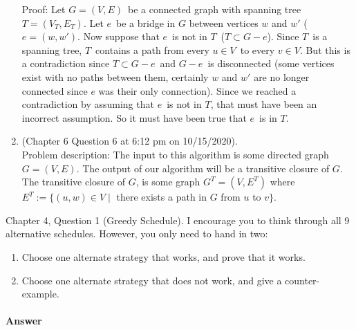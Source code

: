 \documentclass{article}
\begin{document}
\begin{enumerate}
        Proof: Let $G=(V,E)$ be a connected graph with spanning tree $T=(V_T,E_T)$.
        Let $e$ be a bridge in $G$ between vertices $w$ and $w'$ ($e = (w, w')$.
        Now suppose that $e$ is not in $T$ ($T \subset G - e$).
        Since $T$ is a spanning tree, $T$ contains a path from every $u \in V$ to every $v \in V$.
        But this is a contradiction since $T \subset G - e$ and $G - e$ is disconnected (some vertices exist with no paths between them, certainly $w$ and $w'$ are no longer connected since $e$ was their only connection).
        Since we reached a contradiction by assuming that $e$ is not in $T$, that must have been an incorrect assumption.
        So it must have been true that $e$ is in $T$.
    \item (Chapter 6 Question 6 at 6:12 pm on 10/15/2020). \\
        Problem description: The input to this algorithm is some directed graph $G = (V, E)$. The output of our algorithm will be a transitive closure of $G$. The transitive closure of $G$, is some graph $G^T = (V, E^T)$ where $E^T := \{ (u, w) \in V \mid$ there exists a path in $G$ from $u$ to $v \} $. 
\end{enumerate}


\nextprob
{}

Chapter 4, Question 1 (Greedy Schedule).  I encourage you to think through all 9
alternative schedules.  However, you only need to hand in two:
\begin{enumerate}
    \item Choose one alternate strategy that
        works, and prove that it works.
    \item Choose one alternate strategy that does not work, and give a
        counter-example.
\end{enumerate}

\paragraph{Answer}
\end{document}
